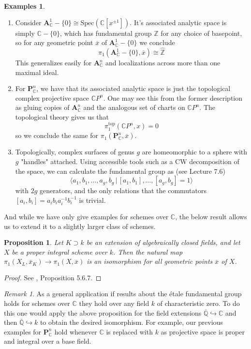 \documentclass{article}
\theoremstyle{definition}
\newtheorem{examples}[theorem]{Examples}
\theoremstyle{remark}
\newtheorem*{remark}{Remark}
\theoremstyle{plain}
\newtheorem{proposition}[theorem]{Proposition}
\newcommand{\C}{\mathbb{C}}
\newcommand{\Z}{\mathbb{Z}}
\newcommand{\Q}{\mathbb{Q}}
\begin{document}
\begin{examples} \text{}
	\begin{enumerate} 	\item Consider $\textbf{A}_{\C}^1 - \{0\} \cong \text{Spec}(\C[x^{\pm 1}])$. 
		It's associated analytic space is simply $\C - \{0\}$, which has fundamental group $\Z$ for any choice of basepoint, so for any geometric point $\overline{x}$ of $\textbf{A}_{\C}^1 - \{0\}$ we conclude
		\[\pi_1(\textbf{A}_{\C}^1 - \{0\}, \overline{x}) \cong \widehat{\Z}\]
		This generalizes easily for $\textbf{A}_{\C}^n$  and localizations across more than one maximal ideal. 
		\item For $\textbf{P}_{\C}^n$, we have that its associated analytic space is just the topological complex projective space $\C P^n$.
	One may see this from the former description as gluing copies of $\textbf{A}_{\C}^n$ and the analogous set of charts on $\C P^n$.
	The topological theory gives us that 
	\[\pi_1^{\text{top}}(\C P^n, x) = 0\]
	so we conclude the same for $\pi_1(\textbf{P}_{\C}^n, \overline{x})$.
\item Topologically, complex surfaces of genus $g$ are homeomorphic to a sphere with $g$ "handles" attached.
	Using accessible tools such as a CW decomposition of the space, we can calculate the fundamental group as (see \cite{FomenkoFuchs} Lecture 7.6)
	\[\langle a_1, b_1, \dots, a_g, b_g \,|\, [a_1,b_1], \dots, [a_g,b_g] = 1\rangle \]
	with $2g$ generators, and the only relations that the commutators $[a_i, b_i] = a_i b_i a_i^{-1} b_i^{-1}$ is trivial.
\end{enumerate}
\end{examples}


And while we have only give examples for schemes over $\C$, the below result allows us to extend it to a slightly larger class of schemes. 
\begin{proposition}
	Let $K \supset k$ be an extension of algebraically closed fields, and let $X$ be a proper integral scheme over $k$.
	Then the natural map $\pi_1(X_L, \overline{x}_K) \to \pi_1(X, \overline{x})$ is an isomorphism for all geometric points $\overline{x}$ of $X$.
\end{proposition} 

\begin{proof}
	See \cite{Szamuely}, Proposition 5.6.7.
\end{proof}

\begin{remark}
	As a general application if results about the \'etale fundamental group holds for schemes over $\C$ they hold over any field  $k$ of characteristic zero.
	To do this one would apply the above proposition for the field extensions $\overline{\Q} \hookrightarrow \C$ and then $\overline{\Q} \hookrightarrow k$ to obtain the desired isomorphism.
	For example, our previous examples for $\textbf{P}_{\C}^n$ hold whenever $\C$ is replaced with $k$ as projective space is proper and integral over a base field.
\end{remark}
\end{document}
